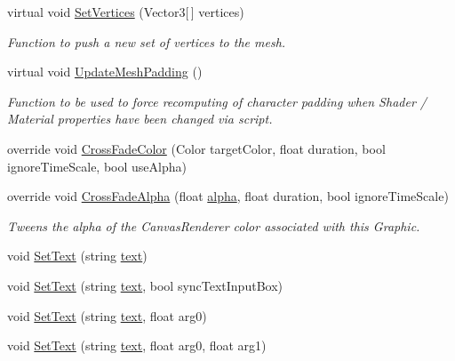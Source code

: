 \begin{DoxyCompactItemize}
virtual void \mbox{\hyperlink{class_t_m_pro_1_1_t_m_p___text_a4b55ef60875f30db737601cf3c14d551}{Set\+Vertices}} (Vector3\mbox{[}$\,$\mbox{]} vertices)
\begin{DoxyCompactList}\small\item\em Function to push a new set of vertices to the mesh. \end{DoxyCompactList}\item 
virtual void \mbox{\hyperlink{class_t_m_pro_1_1_t_m_p___text_a874daa5045c407a26694d92f855c0761}{Update\+Mesh\+Padding}} ()
\begin{DoxyCompactList}\small\item\em Function to be used to force recomputing of character padding when Shader / Material properties have been changed via script. \end{DoxyCompactList}\item 
override void \mbox{\hyperlink{class_t_m_pro_1_1_t_m_p___text_a5474bd0b012d30fca4ad365a4e8e0a4d}{Cross\+Fade\+Color}} (Color target\+Color, float duration, bool ignore\+Time\+Scale, bool use\+Alpha)
\item 
override void \mbox{\hyperlink{class_t_m_pro_1_1_t_m_p___text_a543340c801ac45054c80221f3c5cecba}{Cross\+Fade\+Alpha}} (float \mbox{\hyperlink{class_t_m_pro_1_1_t_m_p___text_aca56e662ce122bb749faa1b044f29a57}{alpha}}, float duration, bool ignore\+Time\+Scale)
\begin{DoxyCompactList}\small\item\em Tweens the alpha of the Canvas\+Renderer color associated with this Graphic. \end{DoxyCompactList}\item 
void \mbox{\hyperlink{class_t_m_pro_1_1_t_m_p___text_a8aebc83540d494fd574a92470762fdaa}{Set\+Text}} (string \mbox{\hyperlink{class_t_m_pro_1_1_t_m_p___text_a98a04e5078612c0586472bd510f91f5c}{text}})
\item 
void \mbox{\hyperlink{class_t_m_pro_1_1_t_m_p___text_a3cd8800ec9be3e3b07c06115a127278e}{Set\+Text}} (string \mbox{\hyperlink{class_t_m_pro_1_1_t_m_p___text_a98a04e5078612c0586472bd510f91f5c}{text}}, bool sync\+Text\+Input\+Box)
\item 
void \mbox{\hyperlink{class_t_m_pro_1_1_t_m_p___text_a3125f71f9672b9de01b574ac42872955}{Set\+Text}} (string \mbox{\hyperlink{class_t_m_pro_1_1_t_m_p___text_a98a04e5078612c0586472bd510f91f5c}{text}}, float arg0)
\item 
void \mbox{\hyperlink{class_t_m_pro_1_1_t_m_p___text_a0a802e1851eafb258d66e0f15f32728f}{Set\+Text}} (string \mbox{\hyperlink{class_t_m_pro_1_1_t_m_p___text_a98a04e5078612c0586472bd510f91f5c}{text}}, float arg0, float arg1)

\end{DoxyCompactItemize}
